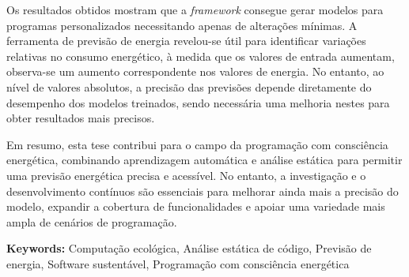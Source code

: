 Os resultados obtidos mostram que a \textit{framework} consegue gerar modelos para programas personalizados necessitando apenas de alterações mínimas. A ferramenta de previsão de energia revelou-se útil para identificar variações relativas no consumo energético, à medida que os valores de entrada aumentam, observa-se um aumento correspondente nos valores de energia. No entanto, ao nível de valores absolutos, a precisão das previsões depende diretamente do desempenho dos modelos treinados, sendo necessária uma melhoria nestes para obter resultados mais precisos.

Em resumo, esta tese contribui para o campo da programação com consciência energética, combinando aprendizagem automática e análise estática para permitir uma previsão energética precisa e acessível. No entanto, a investigação e o desenvolvimento contínuos são essenciais para melhorar ainda mais a precisão do modelo, expandir a cobertura de funcionalidades e apoiar uma variedade mais ampla de cenários de programação.


\vfill

\begin{flushleft}
\textbf{Keywords:}
Computação ecológica, Análise estática de código, Previsão de energia, Software sustentável, Programação com consciência energética
\end{flushleft}

